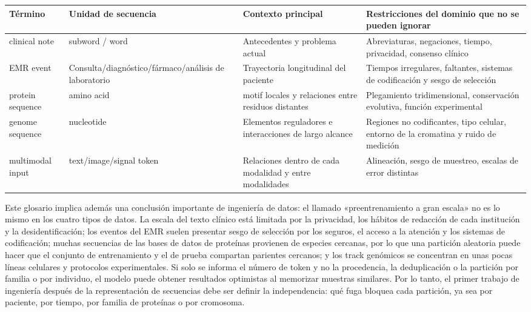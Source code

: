 \documentclass[a4paper]{article}
\begin{document}
\begin{longtable}{@{}L{0.16\textwidth}L{0.19\textwidth}L{0.22\textwidth}L{0.31\textwidth}@{}}
\toprule
Término & Unidad de secuencia & Contexto principal & Restricciones del dominio que no se pueden ignorar \\
\midrule
clinical note & subword / word & Antecedentes y problema actual & Abreviaturas, negaciones, tiempo, privacidad, consenso clínico \\
EMR event & Consulta/diagnóstico/fármaco/análisis de laboratorio & Trayectoria longitudinal del paciente & Tiempos irregulares, faltantes, sistemas de codificación y sesgo de selección \\
protein sequence & amino acid & motif locales y relaciones entre residuos distantes & Plegamiento tridimensional, conservación evolutiva, función experimental \\
genome sequence & nucleotide & Elementos reguladores e interacciones de largo alcance & Regiones no codificantes, tipo celular, entorno de la cromatina y ruido de medición \\
multimodal input & text/image/signal token & Relaciones dentro de cada modalidad y entre modalidades & Alineación, sesgo de muestreo, escalas de error distintas \\
\bottomrule
\end{longtable}

Este glosario implica además una conclusión importante de ingeniería de datos: el llamado «preentrenamiento a gran escala» no es lo mismo en los cuatro tipos de datos. La escala del texto clínico está limitada por la privacidad, los hábitos de redacción de cada institución y la desidentificación; los eventos del EMR suelen presentar sesgo de selección por los seguros, el acceso a la atención y los sistemas de codificación; muchas secuencias de las bases de datos de proteínas provienen de especies cercanas, por lo que una partición aleatoria puede hacer que el conjunto de entrenamiento y el de prueba compartan parientes cercanos; y los track genómicos se concentran en unas pocas líneas celulares y protocolos experimentales. Si solo se informa el número de token y no la procedencia, la deduplicación o la partición por familia o por individuo, el modelo puede obtener resultados optimistas al memorizar muestras similares. Por lo tanto, el primer trabajo de ingeniería después de la representación de secuencias debe ser definir la independencia: qué fuga bloquea cada partición, ya sea por paciente, por tiempo, por familia de proteínas o por cromosoma.
\end{document}
